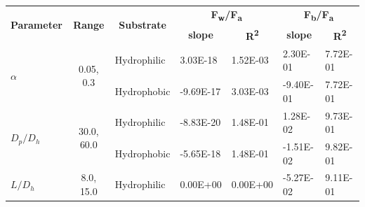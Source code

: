 \documentclass[english]{achemso}
\begin{document}
\begin{table}[H]
\begin{tabular}{|l|c|l|l|l|l|l|}
\hline
\multirow{2}{*}{\textbf{Parameter}} & \multirow{2}{*}{\textbf{Range}} & \multicolumn{1}{c|}{\multirow{2}{*}{\textbf{Substrate}}} & \multicolumn{2}{c|}{\textbf{F\textsubscript{w}/F\textsubscript{a}}}                                    & \multicolumn{2}{c|}{\textbf{F\textsubscript{b}/F\textsubscript{a}}}                                    \\ \cline{4-7} 
                                    &                                 & \multicolumn{1}{c|}{}                                    & \multicolumn{1}{c|}{\textbf{slope}} & \multicolumn{1}{c|}{\textbf{R\textsuperscript{2}}} & \multicolumn{1}{c|}{\textbf{slope}} & \multicolumn{1}{c|}{\textbf{R\textsuperscript{2}}} \\ \hline
\multirow{2}{*}{$\alpha$}              & \multirow{2}{*}{0.05, 0.3}      & Hydrophilic                                              & 3.03E-18                                  & 1.52E-03                               & 2.30E-01                                  & 7.72E-01                               \\ \cline{3-7} 
                                    &                                 & Hydrophobic                                              & -9.69E-17                                 & 3.03E-03                               & -9.40E-01                                 & 7.72E-01                               \\ \hline
\multirow{2}{*}{$D_p/D_h$}             & \multirow{2}{*}{30.0, 60.0}     & Hydrophilic                                              & -8.83E-20                                 & 1.48E-01                               & 1.28E-02                                  & 9.73E-01                               \\ \cline{3-7} 
                                    &                                 & Hydrophobic                                              & -5.65E-18                                 & 1.48E-01                               & -1.51E-02                                 & 9.82E-01                               \\ \hline
\multirow{2}{*}{$L/D_{h}$}         & \multirow{2}{*}{8.0, 15.0}      & Hydrophilic                                              & 0.00E+00                                  & 0.00E+00                               & -5.27E-02                                 & 9.11E-01                               \\ \cline{3-7} 

\end{tabular}
\end{table}
\end{document}
